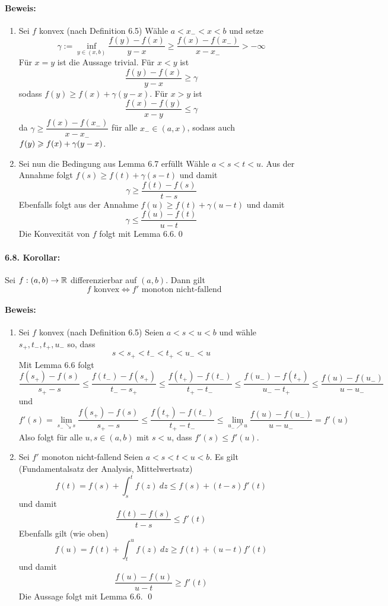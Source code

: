 \documentclass[12pt]{report}
\begin{document}
 \paragraph{Beweis:}
 \begin{enumerate}[label=\Roman*.]
     \item Sei $f$ konvex (nach Definition 6.5)\newline
     W\"ahle $a<x_-<x<b$ und setze
     $$\gamma:=\inf_{y\in(x,b)}\dfrac{f(y)-f(x)}{y-x}\geq\dfrac{f(x)-f(x_-)}{x-x_-}>-\infty$$
     F\"ur $x=y$ ist die Aussage trivial. F\"ur $x<y$ ist 
     $$\dfrac{f(y)-f(x)}{y-x}\geq\gamma$$
     sodass $f(y)\geq f(x)+\gamma(y-x)$. F\"ur $x>y$ ist 
     $$\dfrac{f(x)-f(y)}{x-y}\leq \gamma$$
    da $\gamma\geq \dfrac{f(x)-f(x_-)}{x-x_-}$ f\"ur alle $x_-\in(a,x)$, sodass auch $f(y) \geq\nobreak f(x)+\gamma(y-x)$.
     \item Sei nun die Bedingung aus Lemma 6.7 erf\"ullt\newline
     W\"ahle $a<s<t<u$. Aus der Annahme folgt $f(s)\geq f(t)+\gamma(s-t)$ und damit 
     $$\gamma\geq\dfrac{f(t)-f(s)}{t-s}$$
     Ebenfalls folgt aus der Annahme $f(u)\geq f(t)+\gamma(u-t)$ und damit 
     $$\gamma\leq\dfrac{f(u)-f(t)}{u-t}$$
     Die Konvexit\"at von $f$ folgt mit Lemma 6.6.\qed
 \end{enumerate}
 
 \paragraph{6.8. Korollar:}Sei $f:(a,b)\to\R$ differenzierbar auf $(a,b)$. Dann gilt
 $$f\text{ konvex}\iff f'\text{ monoton nicht-fallend}$$
 
 \paragraph{Beweis:}
 \begin{enumerate}[label=\Roman*.]
     \item Sei $f$ konvex (nach Definition 6.5)\newline
     Seien $a<s<u<b$ und w\"ahle $s_+,t_-,t_+,u_-$ so, dass
     $$s<s_+<t_-<t_+<u_-<u$$
     Mit Lemma 6.6 folgt
     $$\dfrac{f(s_+)-f(s)}{s_+-s}\leq\dfrac{f(t_-)-f(s_+)}{t_--s_+}\leq\dfrac{f(t_+)-f(t_-)}{t_+-t_-}\leq\dfrac{f(u_-)-f(t_+)}{u_--t_+}\leq\dfrac{f(u)-f(u_-)}{u-u_-}$$
     und 
     $$f'(s)=\lim_{s_-\searrow s}\dfrac{f(s_+)-f(s)}{s_+-s}\leq\dfrac{f(t_+)-f(t_-)}{t_+-t_-}\leq\lim_{u_-\nearrow u}\dfrac{f(u)-f(u_-)}{u-u_-}=f'(u)$$
     Also folgt f\"ur alle $u,s\in(a,b)$ mit $s<u$, dass $f'(s)\leq f'(u)$.
     \item Sei $f'$ monoton nicht-fallend\newline
     Seien $a<s<t<u<b$. Es gilt (Fundamentalsatz der Analysis, Mittelwertsatz)
     $$f(t)=f(s)+\int_s^t f(z)\ dz\leq f(s)+(t-s)f'(t)$$
     und damit 
     $$\dfrac{f(t)-f(s)}{t-s}\leq f'(t)$$
     Ebenfalls gilt (wie oben)
     $$f(u)=f(t)+\int_t^uf(z)\ dz\geq f(t)+(u-t)f'(t)$$
     und damit 
     $$\dfrac{f(u)-f(u)}{u-t}\geq f'(t)$$
     Die Aussage folgt mit Lemma 6.6. \qed
 \end{enumerate}
 
\end{document}
